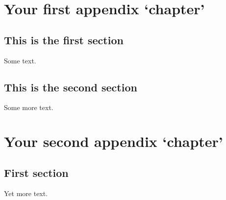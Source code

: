 \appendix
\chapter{Your first appendix `chapter'}
\label{app:first_sec}

	\section{This is the first section}

Some text.

	\section{This is the second section}

Some more text.

\chapter{Your second appendix `chapter'}

	\section{First section}
Yet more text.
